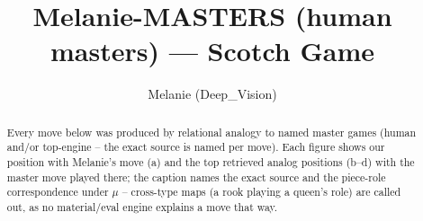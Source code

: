 \documentclass[11pt]{article}
\title{Melanie-MASTERS (human masters) — Scotch Game}
\author{Melanie (Deep\_Vision)}
\date{}
\begin{document}
\maketitle

\begin{abstract}Every move below was produced by relational analogy to named master games (human and/or top-engine -- the exact source is named per move). Each figure shows our position with Melanie's move (a) and the top retrieved analog positions (b--d) with the master move played there; the caption names the exact source and the piece-role correspondence under $\mu$ -- cross-type maps (a rook playing a queen's role) are called out, as no material/eval engine explains a move that way.\end{abstract}

\begin{figure}[p]\centering
\begin{subfigure}{0.46\textwidth}\centering
\resizebox{\linewidth}{!}{%
\newchessgame
\chessboard[
  setfen={r1b1kb1r/p1ppqppp/2p2n2/4P3/8/8/PPP1QPPP/RNB1KB1R b KQkq - 2 7},
  showmover=false,
  pgfstyle=straightmove, color=movearrow, markmove={f6-g8}
]}
\caption{}
\end{subfigure}\hfill
\begin{subfigure}{0.46\textwidth}\centering
\resizebox{\linewidth}{!}{%
\newchessgame
\chessboard[
  setfen={r3kb1r/2ppq1pp/b1p1Pp2/p2n4/2P4P/6P1/PP2QP2/RNB1KB1R b KQkq - 0 11},
  showmover=false,
  pgfstyle=straightmove, color=movearrow, markmove={d5-b6}
]}
\caption{}
\end{subfigure}
\\[4pt]
\begin{subfigure}{0.46\textwidth}\centering
\resizebox{\linewidth}{!}{%
\newchessgame
\chessboard[
  setfen={r1b1k2r/pppp1ppp/2n5/3q4/1b2p3/4P3/PP1PBPPP/R1BQK2R b KQkq - 2 11},
  showmover=false,
  pgfstyle=straightmove, color=movearrow, markmove={d5-g5}
]}
\caption{}
\end{subfigure}\hfill
\begin{subfigure}{0.46\textwidth}\centering
\resizebox{\linewidth}{!}{%
\newchessgame
\chessboard[
  setfen={r1bqr1k1/ppp1bppp/3p1n2/6B1/2PP4/2N5/PP3PPP/R2QRBK1 b - - 5 13},
  showmover=false,
  pgfstyle=straightmove, color=movearrow, markmove={c8-g4}
]}
\caption{}
\end{subfigure}

\end{figure}
\end{document}
